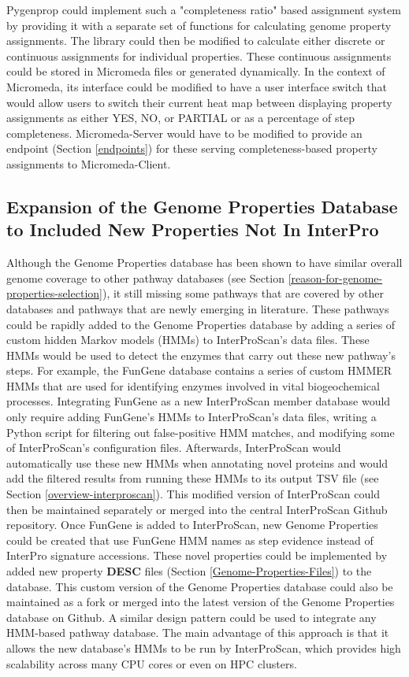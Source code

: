 Pygenprop could implement such a "completeness ratio" based assignment system by providing it with a separate set of functions for calculating genome property assignments. The library could then be modified to calculate either discrete or continuous assignments for individual properties. These continuous assignments could be stored in Micromeda files or generated dynamically. In the context of Micromeda, its interface could be modified to have a user interface switch that would allow users to switch their current heat map between displaying property assignments as either YES, NO, or PARTIAL or as a percentage of step completeness. Micromeda-Server would have to be modified to provide an endpoint (Section \ref{endpoints}) for these serving completeness-based property assignments to Micromeda-Client.

\subsection{Expansion of the Genome Properties Database to Included New Properties Not In InterPro}

Although the Genome Properties database has been shown to have similar overall genome coverage to other pathway databases (see Section \ref{reason-for-genome-properties-selection}), it still missing some pathways that are covered by other databases and pathways that are newly emerging in literature. These pathways could be rapidly added to the Genome Properties database by adding a series of custom hidden Markov models (HMMs) \cite{eddy2011accelerated} to InterProScan's data files. These HMMs would be used to detect the enzymes that carry out these new pathway's steps. For example, the FunGene \cite{fish2013fungene} database contains a series of custom HMMER \cite{eddy2011accelerated} HMMs that are used for identifying enzymes involved in vital biogeochemical processes. Integrating FunGene as a new InterProScan member database would only require adding FunGene's HMMs to InterProScan's data files, writing a Python script for filtering out false-positive HMM matches, and modifying some of InterProScan's configuration files. Afterwards, InterProScan would automatically use these new HMMs when annotating novel proteins and would add the filtered results from running these HMMs to its output TSV file (see Section \ref{overview-interproscan}). This modified version of InterProScan could then be maintained separately or merged into the central InterProScan Github repository. Once FunGene is added to InterProScan, new Genome Properties could be created that use FunGene HMM names as step evidence instead of InterPro signature accessions. These novel properties could be implemented by added new property \textbf{DESC} files (Section \ref{Genome-Properties-Files}) to the database. This custom version of the Genome Properties database could also be maintained as a fork or merged into the latest version of the Genome Properties database on Github. A similar design pattern could be used to integrate any HMM-based pathway database. The main advantage of this approach is that it allows the new database's HMMs to be run by InterProScan, which provides high scalability across many CPU cores or even on HPC clusters.

